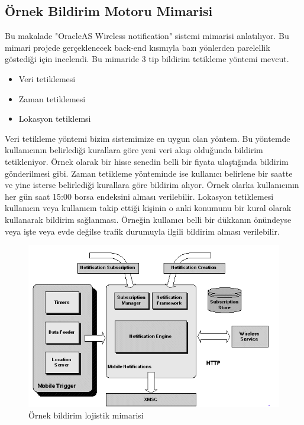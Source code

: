 \subsection{Örnek Bildirim Motoru Mimarisi}
Bu makalade "OracleAS Wireless notification" sistemi mimarisi anlatılıyor. Bu mimari projede gerçeklenecek back-end kısmıyla bazı yönlerden parelellik göstediği için incelendi.
\noindent
Bu mimaride 3 tip bildirim tetikleme yöntemi mevcut.
\begin{itemize}
  \item Veri tetiklemesi
  \item Zaman tetiklemesi
  \item Lokasyon tetiklemsi
\end{itemize}
Veri tetikleme yöntemi bizim sistemimize en uygun olan yöntem. Bu yöntemde kullanıcının belirlediği kurallara göre yeni veri akışı olduğunda bildirim tetikleniyor. Örnek olarak bir hisse senedin belli bir fiyata ulaştığında bildirim gönderilmesi gibi.
\newline
\noindent
Zaman tetikleme yönteminde ise kullanıcı belirlene bir saatte ve yine isterse belirlediği kurallara göre bildirim alıyor. Örnek olarka kullanıcının her gün saat 15:00 borsa endeksini alması verilebilir.
\newline
\noindent
Lokasyon tetiklemesi kullanıcın veya kullanıcın takip ettiği kişinin o anki konumunu bir kural olarak kullanarak bildirim sağlanması. Örneğin kullanıcı belli bir dükkanın önündeyse veya işte veya evde değilse trafik durumuyla ilgili bildirim alması verilebilir.
\begin{figure}[!ht]
    \centering
    \includegraphics[width=\textwidth]{Report/images/notif.png}
    \caption{Örnek bildirim lojistik mimarisi\cite{notif}}
    \label{fig:mesh2}
\end{figure}


